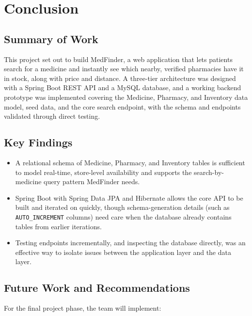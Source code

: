 \documentclass[11pt,a4paper]{report}
\begin{document}
\chapter{Conclusion}

\section{Summary of Work}

This project set out to build MedFinder, a web application that lets patients search for a medicine and instantly see which nearby, verified pharmacies have it in stock, along with price and distance. A three-tier architecture was designed with a Spring Boot REST API and a MySQL database, and a working backend prototype was implemented covering the Medicine, Pharmacy, and Inventory data model, seed data, and the core search endpoint, with the schema and endpoints validated through direct testing.

\section{Key Findings}

\begin{itemize}
    \item A relational schema of Medicine, Pharmacy, and Inventory tables is sufficient to model real-time, store-level availability and supports the search-by-medicine query pattern MedFinder needs.
    \item Spring Boot with Spring Data JPA and Hibernate allows the core API to be built and iterated on quickly, though schema-generation details (such as \texttt{AUTO\_INCREMENT} columns) need care when the database already contains tables from earlier iterations.
    \item Testing endpoints incrementally, and inspecting the database directly, was an effective way to isolate issues between the application layer and the data layer.
\end{itemize}

\section{Future Work and Recommendations}

For the final project phase, the team will implement:
\end{document}
